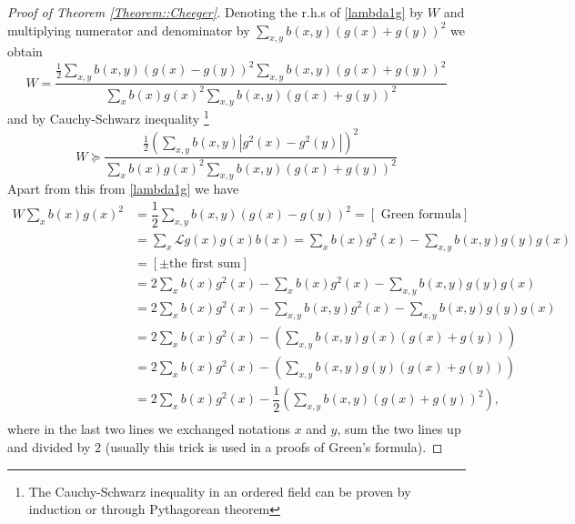 \documentclass[10pt,a4paper]{amsart}
\renewcommand{\L}{\mathcal{L}}
\newcommand{\weight}{b}
\begin{document}
\begin{proof}[Proof of Theorem \ref{Theorem::Cheeger}]
Denoting the r.h.s of \eqref{lambda1g} by $W$ and multiplying numerator and denominator by $\sum_{x,y} \weight (x,y)(g(x)+g(y))^2$ we obtain
\begin{equation*}
W = \dfrac{\frac{1}{2}\sum_{x,y}\weight (x,y)(g(x)-g(y))^2 \sum_{x,y}\weight (x,y) (g(x)+g(y))^2}{\sum_x \weight (x)g(x)^2 \sum_{x,y} \weight (x,y)(g(x)+g(y))^2}
\end{equation*}
and by Cauchy-Schwarz inequality \footnote{The Cauchy-Schwarz inequality in an ordered field can be proven by induction or through Pythagorean theorem} 
\begin{equation}\label{W1}
W\succeq \dfrac{\frac{1}{2}\left(\sum_{x,y}\weight (x,y)\left|g^2(x)-g^2(y)\right|\right)^2}{\sum_x \weight (x)g(x)^2 \sum_{x,y} \weight (x,y)(g(x)+g(y))^2}
\end{equation}
Apart from this from \eqref{lambda1g} we have
\begin{align*}
W\sum_x \weight (x)g(x)^2&= \dfrac{1}{2}\sum_{x,y} \weight (x,y) (g(x)-g(y))^2 =[\mbox{ Green formula}]\\
&=\sum_{x}\L g(x)g(x)\weight (x)=\sum_{x} \weight (x)g^2(x)- \sum_{x,y} \weight (x,y)g(y)g(x)\\
&=[\pm\mbox{the first sum}]\\
&=2\sum_{x} \weight (x)g^2(x)-\sum_{x} \weight (x)g^2(x) - \sum_{x,y} \weight (x,y) g(y)g(x)\\
&=2\sum_{x} \weight (x)g^2(x)-\sum_{x,y} \weight (x,y)g^2(x) -\sum_{x,y} \weight (x,y) g(y)g(x)\\
&=2\sum_{x} \weight (x)g^2(x)-\left(\sum_{x,y} \weight (x,y)g(x)(g(x)+g(y))\right)\\
&=2\sum_{x} \weight (x)g^2(x)-\left(\sum_{x,y} \weight (x,y)g(y)(g(x)+g(y))\right)\\
&=2\sum_{x} \weight (x)g^2(x)-\dfrac{1}{2}\left(\sum_{x,y} \weight (x,y)(g(x)+g(y))^2\right),\\
\end{align*}
where in the last two lines we exchanged notations $x$ and $y$, sum the two lines up and divided by $2$ (usually this trick is used in a proofs of Green's formula).


\end{proof}
\end{document}
